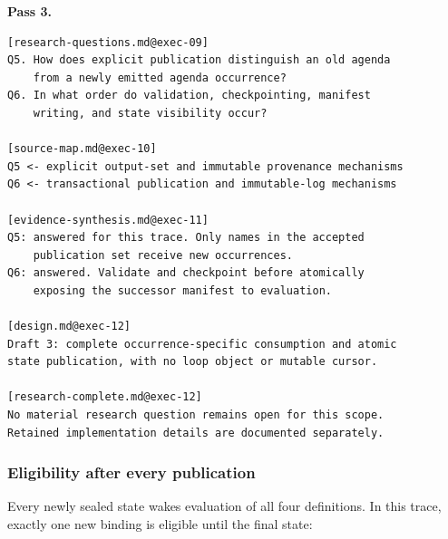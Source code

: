 \documentclass[11pt]{article}
\begin{document}
\medskip
\noindent\textbf{Pass 3.}\par\smallskip

\begin{lstlisting}[style=playbook,basicstyle=\ttfamily\scriptsize]
[research-questions.md@exec-09]
Q5. How does explicit publication distinguish an old agenda
    from a newly emitted agenda occurrence?
Q6. In what order do validation, checkpointing, manifest
    writing, and state visibility occur?

[source-map.md@exec-10]
Q5 <- explicit output-set and immutable provenance mechanisms
Q6 <- transactional publication and immutable-log mechanisms

[evidence-synthesis.md@exec-11]
Q5: answered for this trace. Only names in the accepted
    publication set receive new occurrences.
Q6: answered. Validate and checkpoint before atomically
    exposing the successor manifest to evaluation.

[design.md@exec-12]
Draft 3: complete occurrence-specific consumption and atomic
state publication, with no loop object or mutable cursor.

[research-complete.md@exec-12]
No material research question remains open for this scope.
Retained implementation details are documented separately.
\end{lstlisting}

\subsubsection{Eligibility after every publication}

Every newly sealed state wakes evaluation of all four definitions. In this
trace, exactly one new binding is eligible until the final state:
\end{document}
